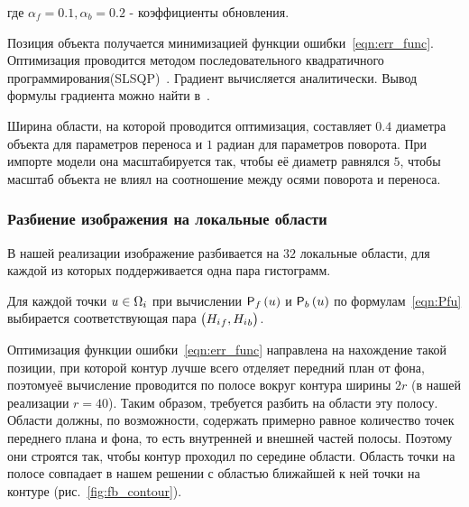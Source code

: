 где $\alpha_f = 0.1, \alpha_b = 0.2$ - коэффициенты обновления.

Позиция объекта получается минимизацией функции ошибки~\ref{eqn:err_func}.
Оптимизация проводится методом последовательного квадратичного
программирования(SLSQP)~\cite{SLSQP}.
Градиент вычисляется аналитически.
Вывод формулы градиента можно найти в~\cite{Tjaden2018}.

Ширина области, на которой проводится оптимизация, составляет $0.4$ диаметра
объекта для параметров переноса и $1$ радиан для параметров поворота.
При импорте модели она масштабируется так, чтобы её диаметр равнялся $5$,
чтобы масштаб объекта не влиял на соотношение между осями поворота и переноса.



\subsubsection*{Разбиение изображения на локальные области}

В нашей реализации изображение разбивается на $32$ локальные области, для
каждой из
которых поддерживается одна пара гистограмм.

Для каждой точки $\mathnormal{u} \in \Omega_i$ при вычислении $\mathsf{P}_f \left( \mathnormal{u} \right)$ и
$\mathsf{P}_b \left( \mathnormal{u} \right)$ по
формулам~\ref{eqn:Pfu} выбирается соответствующая пара $\left( {H_i}_f,
{H_i}_b \right)$.

Оптимизация функции ошибки~\ref{eqn:err_func} направлена на нахождение такой
позиции, при которой контур лучше всего отделяет передний план от фона, поэтомуеё вычисление проводится по полосе вокруг контура ширины $2r$ (в нашей
реализации $r = 40$).
Таким образом, требуется разбить на области эту полосу.
Области должны, по возможности, содержать примерно равное количество точек
переднего плана и фона, то есть внутренней и внешней частей полосы.
Поэтому они строятся так, чтобы контур проходил по середине
области.
Область точки на полосе совпадает в нашем решении с областью ближайшей к ней
точки на контуре (рис.~\ref{fig:fb_contour}).


